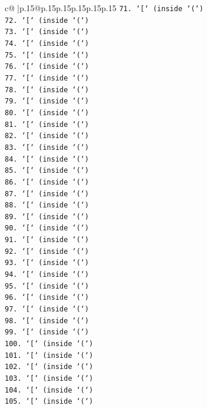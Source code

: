 \documentclass{article}
\begin{document}
{\begin{supertabular}{c@{$\;$}|p{.15\linewidth}@{}p{.15\linewidth}p{.15\linewidth}p{.15\linewidth}p{.15\linewidth}p{.15\linewidth}}
{{{\texttt{71. `{[}` (inside `(`)} \\
\texttt{72. `{[}` (inside `(`)} \\
\texttt{73. `{[}` (inside `(`)} \\
\texttt{74. `{[}` (inside `(`)} \\
\texttt{75. `{[}` (inside `(`)} \\
\texttt{76. `{[}` (inside `(`)} \\
\texttt{77. `{[}` (inside `(`)} \\
\texttt{78. `{[}` (inside `(`)} \\
\texttt{79. `{[}` (inside `(`)} \\
\texttt{80. `{[}` (inside `(`)} \\
\texttt{81. `{[}` (inside `(`)} \\
\texttt{82. `{[}` (inside `(`)} \\
\texttt{83. `{[}` (inside `(`)} \\
\texttt{84. `{[}` (inside `(`)} \\
\texttt{85. `{[}` (inside `(`)} \\
\texttt{86. `{[}` (inside `(`)} \\
\texttt{87. `{[}` (inside `(`)} \\
\texttt{88. `{[}` (inside `(`)} \\
\texttt{89. `{[}` (inside `(`)} \\
\texttt{90. `{[}` (inside `(`)} \\
\texttt{91. `{[}` (inside `(`)} \\
\texttt{92. `{[}` (inside `(`)} \\
\texttt{93. `{[}` (inside `(`)} \\
\texttt{94. `{[}` (inside `(`)} \\
\texttt{95. `{[}` (inside `(`)} \\
\texttt{96. `{[}` (inside `(`)} \\
\texttt{97. `{[}` (inside `(`)} \\
\texttt{98. `{[}` (inside `(`)} \\
\texttt{99. `{[}` (inside `(`)} \\
\texttt{100. `{[}` (inside `(`)} \\
\texttt{101. `{[}` (inside `(`)} \\
\texttt{102. `{[}` (inside `(`)} \\
\texttt{103. `{[}` (inside `(`)} \\
\texttt{104. `{[}` (inside `(`)} \\
\texttt{105. `{[}` (inside `(`)} \\
}}}
\end{supertabular}}
\end{document}
